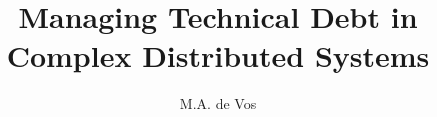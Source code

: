 \documentclass[whitelogo]{tudelft-report}
\begin{document}
\frontmatter

\title[tudelft-white]{Managing Technical Debt in Complex Distributed Systems}
\author[tudelft-white]{M.A. de Vos}

\setlength\parindent{0pt}





\tableofcontents

\mainmatter








\appendix

%


\end{document}
